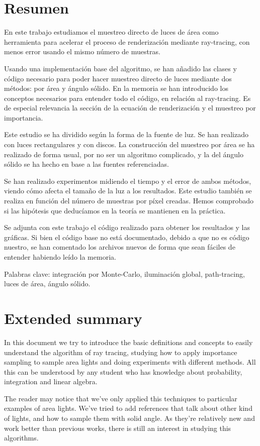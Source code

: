 \documentclass{scrbook}
\begin{document}
\section{Resumen}
En este trabajo estudiamos el muestreo directo de luces de área como herramienta para acelerar el proceso de renderización mediante ray-tracing, con menos error usando el mismo número de muestras.

Usando una implementación base del algoritmo, se han añadido las clases y código necesario para poder hacer muestreo directo de luces mediante dos métodos: por área y ángulo sólido. En la memoria se han introducido los conceptos necesarios para entender todo el código, en relación al ray-tracing. Es de especial relevancia la sección de la ecuación de renderización y el muestreo por importancia.

Este estudio se ha dividido según la forma de la fuente de luz. Se han realizado con luces rectangulares y con discos. La construcción del muestreo por área se ha realizado de forma usual, por no ser un algoritmo complicado, y la del ángulo sólido se ha hecho en base a las fuentes referenciadas.

Se han realizado experimentos midiendo el tiempo y el error de ambos métodos, viendo cómo afecta el tamaño de la luz a los resultados. Este estudio también se realiza en función del número de muestras por píxel creadas. Hemos comprobado si las hipótesis que deducíamos en la teoría se mantienen en la práctica.

Se adjunta con este trabajo el código realizado para obtener los resultados y las gráficas. Si bien el código base no está documentado, debido a que no es código nuestro, se han comentado los archivos nuevos de forma que sean fáciles de entender habiendo leído la memoria.

Palabras clave: integración por Monte-Carlo, iluminación global, path-tracing, luces de área, ángulo sólido.

\section{Extended summary}
In this document we try to introduce the basic definitions and concepts to easily understand the algorithm of ray tracing, studying how to apply importance sampling to sample area lights and doing experiments with different methods. All this can be understood by any student who has knowledge about probability, integration and linear algebra.

The reader may notice that we've only applied this techniques to particular examples of area lights. We've tried to add references that talk about other kind of lights, and how to sample them with solid angle. As they're relatively new and work better than previous works, there is still an interest in studying this algorithms.
\end{document}
